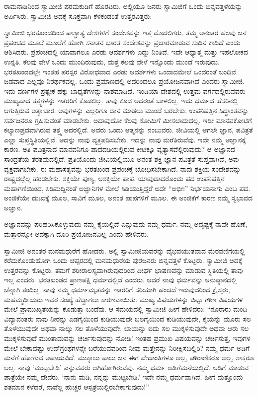  ರಾಮನಾಡಿನಿಂದ ಸ್ವಾಮೀಜಿ ಪರಮಕುಡಿಗೆ ಹೊರಟರು. ಅಲ್ಲಿಯೂ ಜನರು ಸ್ವಾಮಿಜಿಗೆ ಒಂದು ಬಿನ್ನವತ್ತಳೆಯನ್ನು ಅರ್ಪಿಸಿರು. ಸ್ವಾಮೀಜಿ ಅದಕ್ಕೆ ಸೂಕ್ತವಾಗಿ ಕೆಳಕಂಡಂತೆ ಉತ್ತರವಿತ್ತರು: 

 ಸ್ವಾಮೀಜಿ ಭರತಖಂಡದಿಂದ ಪಾಶ್ಚಾತ್ಯ ದೇಶಗಳಿಗೆ ಸಂದೇಶವನ್ನು ಇತ್ತ ಮೊದಲಿಗರು. ತಮ್ಮ ಅನಂತರ ಹಲವು ಜನ ಪ್ರಪಂಚದ ಮೂಲೆ ಮೂಲೆಗೆ ಹೋಗಿ ಸನಾತನ ಭಾರತ ಸಂದೇಶವನ್ನು ಪ್ರಚಾರಮಾಡುವ ಸುದಿನ ಕಾದಿದೆ ಎಂದು ಆಶಿಸಿದರು. ಪ್ರಪಂಚದಲ್ಲಿ ಯಾವಾಗಲೂ ಎರಡು ಆದರ್ಶಗಳು ಎದ್ದು ನಿಂತಿವೆ. ಇದೇ ಆಧ್ಯಾತ್ಮ ಮತ್ತು ಇಹಲೋಕದ ಉನ್ನತಿ. ಕೆಲವು ವೇಳೆ ಒಂದು ಮುಂದಿರುವುದು, ಮತ್ತೆ ಕೆಲವು ವೇಳೆ ಇನ್ನೊಂದು ಮುಂದೆ ಇರುವುದು. ಭರತಖಂಡದಲ್ಲೇ ಇಂತಹ ಪರಸ್ಪರ ವಿರೋಧವಾದ ಎರಡು ಆದರ್ಶಗಳು ಒಂದಾದಮೇಲೆ ಒಂದರಂತೆ ಬಂದಿವೆ. ಜಡವಾದ ಎಲ್ಲವೂ ನಿರರ್ಥಕವಲ್ಲ. ಒಂದು ಪ್ರಮಾಣದಲ್ಲಿ ಅದರಿಂದಲೂ ಪ್ರಯೋಜನವಾಗಿದೆ ಎಂದರು ಸ್ವಾಮೀಜಿ. ಇದು ವರ್ಣಗಳ ಪ್ರತ್ಯೇಕ ಹಕ್ಕು ಬಾಧ್ಯತೆಗಳನ್ನು ನಾಶಮಾಡಿದೆ. ಇಂಡಿಯಾ ದೇಶದಲ್ಲಿ ಉತ್ತಮ ವರ್ಗದಲ್ಲಿರುವವರು ಮುಖ್ಯವಾದ ತತ್ತ್ವಗಳನ್ನು ಇತರರಿಗೆ ಕೊಡಲಿಲ್ಲ. ತಾವು ಕೂಡ ಅದರಂತೆ ಬಾಳಲಿಲ್ಲ. ಇದು ಧರ್ಮದ ಹೆಸರಿನಲ್ಲಿ ಆಗುತ್ತಿರುವ ಅತ್ಯಾಚಾರ. ಅವುಗಳನ್ನು ಎಲ್ಲರಿಗೂ ದಾನ ಮಾಡಲು ಮುಂದೆ ಬರಬೇಕು. ಉಪನಿಷತ್ತಿನ ಸಿದ್ಧಾಂತವನ್ನು ಸರ್ವಜನರೂ ಗ್ರಹಿಸುವಂತೆ ಮಾಡಬೇಕು. ಅದಾವುದೋ ಕೆಲವು ಕೋಮಿಗೆ ಮೀಸಲಾದುದಲ್ಲ. ಇಡೀ ಮಾನವಕೋಟಿಗೆ ಕಲ್ಯಾಣಪ್ರದವಾಗಿರುವ ತತ್ತ್ವ ಅದರಲ್ಲಿದೆ. ಅವರು ಒಂದು ಆತ್ಮನನ್ನು ನಂಬುವರು. ಜೀವಿಯಲ್ಲಿ ಆಗಲೇ ಜ್ಞಾನ, ಪವಿತ್ರತೆ ಎಲ್ಲಾ ಸುಪ್ತಸ್ಥಿತಿಯಲ್ಲಿವೆ. ಅದನ್ನು ನಾವು ವ್ಯಕ್ತಪಡಿಸಬೇಕು. ಇದನ್ನು ನಾವು ಮರೆತಿರುವೆವು. ಇದೇ ನಮ್ಮ ಅಜ್ಞಾನಕ್ಕೆ ಕಾರಣ. ಅತಿ ಪವಿತ್ರನಾದ ಮಾನವನಿಗೂ ಪಾದದಡಿಯಲ್ಲಿರುವ ಕೀಟಕ್ಕೂ ವ್ಯತ್ಯಾಸವೆಲ್ಲಿರುವುದು? ಆ ಅಜ್ಞಾನದ ಸಾಂದ್ರತೆಯ ತರತಮದಲ್ಲಿದೆ. ಪ್ರತಿಯೊಂದು ಜೀವಿಯಲ್ಲಿಯೂ ಅನಂತ ಶಕ್ತಿ ಜ್ಞಾನ ಪವಿತ್ರತೆ ಸುಪ್ತವಾಗಿವೆ, ಅವು ವ್ಯಕ್ತವಾಗಬೇಕು. ಈ ಮಹಾಸತ್ಯವನ್ನು ಭರತಖಂಡ ಪ್ರಪಂಚಕ್ಕೆ ಬೋಧಿಸಬೇಕಾಗಿದೆ. ನಾವು ಶಕ್ತಿಯ ಸಂದೇಶವನ್ನು ರಾಷ್ಟ್ರದಲ್ಲೆಲ್ಲ ಹರಡಬೇಕು. ಶಕ್ತಿಯೇ ಪುಣ್ಯ, ಅಶಕ್ತಿಯೇ ಪಾಪ. ಯಾವುದಾದರೊಂದು ಪದ ಉಪನಿಷತ್ತಿನ ಮಹಾಗಣಿಯಿಂದ, ಸಿಡಿಮದ್ದಿನಂತೆ ಅಜ್ಞಾನಿಗಳ ಮೇಲೆ ಸಿಡಿಯುತ್ತಿದ್ದರೆ ಅದೇ “ಅಭೀಃ” ನಿರ್ಭಯನಾಗು ಎಂಬ ಪದ. ಅಂಜಿಕೆಯೇ ದುಃಖಕ್ಕೆ ಮೂಲ, ಸಾವಿಗೆ ಮೂಲ, ಅನಂತ ಪಾಪಗಳಿಗೆ ಮೂಲ. ಈ ಅಂಜಿಕೆಗೆ ಕಾರಣ ನಮ್ಮ ಸ್ವಭಾವದ ಅಜ್ಞಾನ. 

 ಅಜ್ಞಾನವನ್ನು ಪರಿಹರಿಸಿಕೊಳ್ಳುವುದು ನಮ್ಮ ಕೈಯಲ್ಲಿದೆ ಎನ್ನುವುದು ನಮ್ಮ ಧರ್ಮ. ನಮ್ಮ ಅದೃಷ್ಟಕ್ಕೆ ನಾವೇ ಹೊಣೆ, ಮತ್ತಾರನ್ನೋ ಅದಕ್ಕಾಗಿ ದೂರಿ ಪ್ರಯೋಜನವಿಲ್ಲ ಎಂದು ಹೇಳಿದರು. 

 ಸ್ವಾಮೀಜಿ ಅನಂತರ ಮನಮಧುರೆಗೆ ಹೋದರು. ಅಲ್ಲಿ ಸ್ವಾಮೀಜಿಯವರನ್ನು ವೈಭವಯುತವಾದ ಮೆರವಣಿಗೆಯಲ್ಲಿ ಕರೆದುಕೊಂಡುಹೋಗಿ ಒಂದು ಚಪ್ಪರದಲ್ಲಿ ಮನಮಧುರೆಯ ಪುರಜನರು ಬಿನ್ನವತ್ತಳೆ ಕೊಟ್ಟರು. ಸ್ವಾಮೀಜಿ ಅದಕ್ಕೆ ಉತ್ತರವನ್ನು ಕೊಟ್ಟರು. ತಮಗೆ ಶರೀರಾಲಸ್ಯವಾಗಿರುವುದರಿಂದ ದೀರ್ಘ ಭಾಷಣವನ್ನು ಮಾಡುವ ಸ್ಥಿತಿಯಲ್ಲಿ ತಾವು ಇಲ್ಲ ಎಂದರು. ಭರತಖಂಡದ ಪ್ರಾಣಪಕ್ಷಿ ಧರ್ಮದಲ್ಲಿದೆ ಎಂದರು. ಆದರೆ ನಾವು ಧರ್ಮವನ್ನು ಅನುಷ್ಠಾನದಲ್ಲಿ ಚೆನ್ನಾಗಿ ತಂದಿಲ್ಲ. ನಾವು ನಮ್ಮ ಧರ್ಮಾಮೃತವನ್ನು ಇತರರಿಗೆ ಸರಿಯಾಗಿ ಹಂಚದೆ ಇರುವುದರಿಂದ ಕ್ರೈಸ್ತರು, ಮಹಮ್ಮದೀಯರು ಇವರ ಸಂಖ್ಯೆ ಹೆಚ್ಚಾಗಲು ಕಾರಣವಾಯಿತು. ಮುಖ್ಯ ವಿಷಯಗಳನ್ನು ಬಿಟ್ಟು ಗೌಣ ವಿಷಯಗಳ ಮೇಲೆ ಪ್ರಾಮುಖ್ಯತೆಯನ್ನು ಕೊಡುತ್ತಾ ಬಂದೆವು. ಆ ಸಮಯದಲ್ಲಿ ಸ್ವಾಮೀಜಿ ಹೀಗೆ ಹೇಳಿದರು: “ನೂರಾರು ಮಂದಿ ವಿದ್ಯಾವಂತರು ನಾವು ನೀರನ್ನು ಎಡಗೈಯಿಂದ ಕುಡಿಯುವುದೇ ಬಲಗೈಯಿಂದ ಕುಡಿಯುವುದೇ, ಕೈಯನ್ನು ಮೂರು ಸಲ ತೊಳೆಯುವುದೇ ಅಥವಾ ನಾಲ್ಕು ಸಲ ತೊಳೆಯುವುದೇ, ಬಾಯನ್ನು ಐದು ಸಲ ಮುಕ್ಕಳಿಸುವುದೇ ಅಥವಾ ಆರು ಸಲ ಮುಕ್ಕಳಿಸುವುದೆ ಮುಂತಾದುವನ್ನು ಚರ್ಚಿಸುವುದನ್ನು ನೋಡಿ! ಇಂತಹ ಪ್ರಮುಖ ವಿಷಯವನ್ನು ಚರ್ಚಿಸುತ್ತ, ಇವುಗಳ ಮೇಲೆ ಬೇಕಾದಷ್ಟು ಉದ್‌ಗ್ರಂಥಗಳನ್ನೇ ಬರೆಯುವವರಿಂದ ನೀವು ಮತ್ತೇನನ್ನು ನಿರೀಕ್ಷಿಸಬಲ್ಲಿರಿ? ನಮ್ಮ ಧರ್ಮ ಅಡಿಗೆ ಮನೆಗೆ ಹೋಗುವ ಅಪಾಯವಿದೆ. ಮುಕ್ಕಾಲು ಪಾಲು ಜನ ಈಗ ವೇದಾಂತಿಗಳೂ ಅಲ್ಲ, ಪೌರಾಣಿಕರೂ ಅಲ್ಲ, ಶಾಕ್ತರೂ ಅಲ್ಲ. ನಾವು ‘ಮುಟ್ಟಬೇಡಿ’ ಎನ್ನುವವರು ಆಗಿಹೋಗಿರುವೆವು. ನಮ್ಮ ಧರ್ಮ ಅಡಿಗೆಮನೆಯಲ್ಲಿದೆ. ಅಡಿಗೆ ಮಾಡುವ ಪಾತ್ರೆಯೇ ನಮ್ಮ ದೇವರು. ‘ನಾನು ಮಡಿ, ನನ್ನನ್ನು ಮುಟ್ಟಬೇಡಿ.’ ಇದೇ ನಮ್ಮ ಧರ್ಮವಾಗಿದೆ. ಹೀಗೆ ಮತ್ತೊಂದು ಶತಮಾನ ಕಳೆದರೆ, ನಾವೆಲ್ಲ ಹುಚ್ಚರ ಆಸ್ಪತ್ರೆಯಲ್ಲಿರಬೇಕಾಗುವುದು!” 

